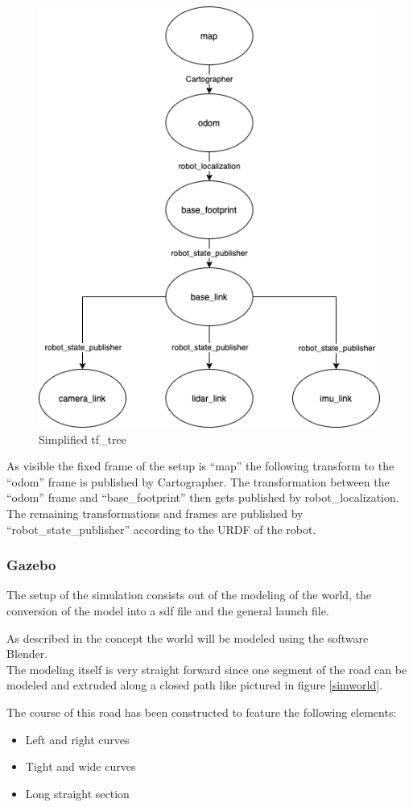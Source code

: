\begin{figure} 
	\centering
	\includegraphics[width=.5\textwidth]{Pictures/tf tree simplified}
	\caption{Simplified tf\_tree}
	\label{tfsimp}
\end{figure}

As visible the fixed frame of the setup is ``map'' the following transform to the ``odom'' frame is published by Cartographer. The transformation between the ``odom'' frame and ``base\_footprint'' then gets published by robot\_localization.\\
The remaining transformations and frames are published by ``robot\_state\_publisher'' according to the URDF of the robot.

\subsubsection{Gazebo}
The setup of the simulation consists out of the modeling of the world, the conversion of the model into a sdf file and the general launch file.

As described in the concept the world will be modeled using the software Blender.\\

The modeling itself is very straight forward since one segment of the road can be modeled and extruded along a closed path like pictured in figure \ref{simworld}. 

The course of this road has been constructed to feature the following elements:

\begin{itemize}
	\item Left and right curves
	\item Tight and wide curves
	\item Long straight section
\end{itemize}


